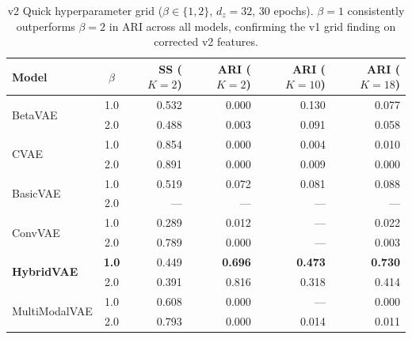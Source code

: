\documentclass{article}
\begin{document}
\begin{table}[H]
\centering
\caption{v2 Quick hyperparameter grid ($\beta\!\in\!\{1,2\}$, $d_z\!=\!32$, 30 epochs).
$\beta\!=\!1$ consistently outperforms $\beta\!=\!2$ in ARI across all models,
confirming the v1 grid finding on corrected v2 features.}
\label{tab:v2_finetune}
\small
\begin{tabular}{lcrrrr}
\toprule
\textbf{Model} & \textbf{$\beta$} & \textbf{SS ($K\!=\!2$)} &
\textbf{ARI ($K\!=\!2$)} & \textbf{ARI ($K\!=\!10$)} & \textbf{ARI ($K\!=\!18$)} \\
\midrule
\multirow{2}{*}{BetaVAE} & 1.0 & 0.532 & 0.000 & 0.130 & 0.077 \\
                          & 2.0 & 0.488 & 0.003 & 0.091 & 0.058 \\
\midrule
\multirow{2}{*}{CVAE}     & 1.0 & 0.854 & 0.000 & 0.004 & 0.010 \\
                          & 2.0 & 0.891 & 0.000 & 0.009 & 0.000 \\
\midrule
\multirow{2}{*}{BasicVAE} & 1.0 & 0.519 & 0.072 & 0.081 & 0.088 \\
                          & 2.0 & ---   & ---   & ---   & ---   \\
\midrule
\multirow{2}{*}{ConvVAE}  & 1.0 & 0.289 & 0.012 & ---   & 0.022 \\
                          & 2.0 & 0.789 & 0.000 & ---   & 0.003 \\
\midrule
\multirow{2}{*}{\textbf{HybridVAE}} & \textbf{1.0} & 0.449 & \textbf{0.696} & \textbf{0.473} & \textbf{0.730} \\
                          & 2.0 & 0.391 & 0.816 & 0.318 & 0.414 \\
\midrule
\multirow{2}{*}{MultiModalVAE} & 1.0 & 0.608 & 0.000 & ---   & 0.000 \\
                               & 2.0 & 0.793 & 0.000 & 0.014 & 0.011 \\
\bottomrule
\end{tabular}
\end{table}
\end{document}
